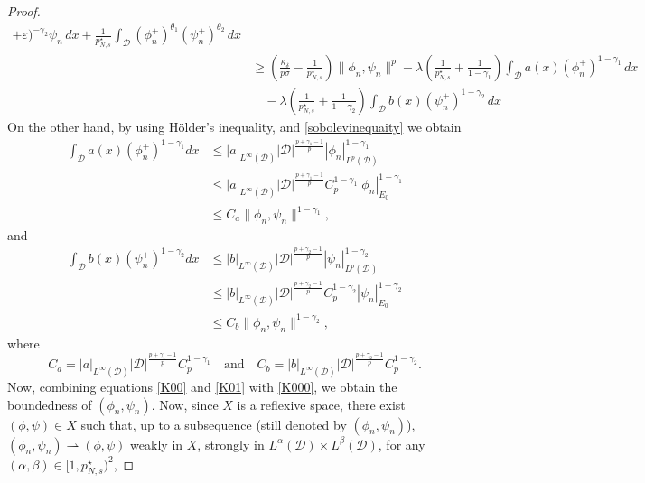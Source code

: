 \documentclass[10pt,a4paper]{amsart}
\numberwithin{equation}{section}
\begin{document}
\begin{proof}
\begin{equation}
\begin{aligned}
 +\varepsilon)^{-\gamma_2}\psi_n\,dx+\frac{1}{p^\star_{N,s}}\int_\mathcal{D}
 (\phi_n^+)^{\theta_1}(\psi_n^+)^{\theta_2}\,dx \\
&\geq(\frac{\kappa_\delta}{p\sigma}-\frac{1}{p^\star_{N,s}})\| \phi_n,\psi_n\|^p
 -\lambda(\frac{1}{p^\star_{N,s}}+\frac{1}{1-\gamma_1})
  \int_\mathcal{D} a(x)(\phi_n^+)^{1-\gamma_1}\,dx\\
&\quad -\lambda(\frac{1}{p^\star_{N,s}}+\frac{1}{1-\gamma_2})
 \int_\mathcal{D} b(x)(\psi_n^+)^{1-\gamma_2}\,dx
\end{aligned}
\end{equation}
On the other hand, by using  H\"older's inequality, and \eqref{sobolevinequaity}
  we obtain
\begin{equation} \label{K00}
\begin{aligned}
\int_\mathcal{D} a(x)(\phi_n^+)^{1-\gamma_1} dx
&\leq |a|_{L^\infty(\mathcal{D})}|\mathcal{D}|^\frac{p+\gamma_1-1}{p}
 |\phi_n|_{L^p(\mathcal{D})}^{1-\gamma_1} \\
&\leq |a|_{L^\infty(\mathcal{D})}|\mathcal{D}|^\frac{p+\gamma_1-1}{p}
 C_p^{1-\gamma_1}|\phi_n|_{E_0}^{1-\gamma_1}\\
&\leq C_a \| \phi_n,\psi_n\|^{1-\gamma_1},
\end{aligned}
\end{equation}
and
\begin{equation}  \label{K01}
\begin{aligned}
\int_\mathcal{D} b(x)(\psi_n^+)^{1-\gamma_2} dx
&\leq |b|_{L^\infty(\mathcal{D})}|\mathcal{D}|^\frac{p+\gamma_2-1}{p}
 |\psi_n|_{L^p(\mathcal{D})}^{1-\gamma_2} \\
&\leq |b|_{L^\infty(\mathcal{D})}|\mathcal{D}|^\frac{p+\gamma_2-1}{p}
 C_p^{1-\gamma_2}|\psi_n|_{E_0}^{1-\gamma_2}\\
&\leq C_b \| \phi_n,\psi_n\|^{1-\gamma_2},
\end{aligned}
\end{equation}
where
$$
C_a=|a|_{L^\infty(\mathcal{D})}|\mathcal{D}|^\frac{p+\gamma_1-1}{p}C_p^{1-\gamma_1}\quad
\text{and}\quad
C_b=|b|_{L^\infty(\mathcal{D})}|\mathcal{D}|^\frac{p+\gamma_2-1}{p}C_p^{1-\gamma_2}.
$$
Now, combining equations \eqref{K00} and \eqref{K01} with \eqref{K000}, we obtain
the boundedness of $(\phi_n,\psi_n)$. Now, since $X$ is a reflexive space, there exist
$(\phi,\psi)\in X$ such that, up to a subsequence (still denoted by $(\phi_n,\psi_n)$),
$(\phi_n,\psi_n)\rightharpoonup (\phi,\psi)$ weakly in $X$, strongly in
$ L^\alpha(\mathcal{D})\times L^\beta(\mathcal{D})$, for any $(\alpha,\beta)\in [1,p^\star_{N,s})^2$,

\end{proof}
\end{document}
